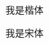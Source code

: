 \documentclass{article}
\begin{document}
\begin{CJK}{UTF8}{gkai}
我是楷体
\end{CJK}
\begin{CJK}{UTF8}{gbsn}
我是宋体
\end{CJK}
\end{document}
